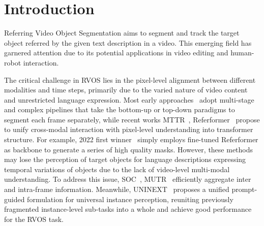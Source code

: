 \documentclass[10pt,twocolumn,letterpaper]{article}
\begin{document}
\section{Introduction}
\label{sec:intro}
Referring Video Object Segmentation aims to segment and track the target object referred by the given text description in a video.
This emerging field has garnered attention due to its potential applications in video editing and human-robot interaction. 

The critical challenge in RVOS lies in the pixel-level alignment between different modalities and time steps, primarily due to the varied nature of video content and unrestricted language expression. 
Most early approaches~\cite{refvos,rel1,rel2} adopt multi-stage and complex pipelines that take the bottom-up or top-down paradigms to segment each frame separately, while recent works MTTR~\cite{mttr}, Referformer~\cite{referformer} propose to unify cross-modal interaction with pixel-level understanding into transformer structure.
For example, 2022 first winner~\cite{last_champ} simply employs fine-tuned Referformer as backbone to generate a series of high quality masks.
However, these methods may lose the perception of target objects for language descriptions expressing temporal variations of objects due to the lack of video-level multi-modal understanding.
To address this issue, SOC~\cite{soc}, MUTR~\cite{mutr} efficiently aggregate inter and intra-frame information.
Meanwhile, UNINEXT~\cite{UNINEXT} proposes a unified prompt-guided formulation for universal instance perception, reuniting previously fragmented instance-level sub-tasks into a whole and achieve good performance for the RVOS task.
\end{document}
